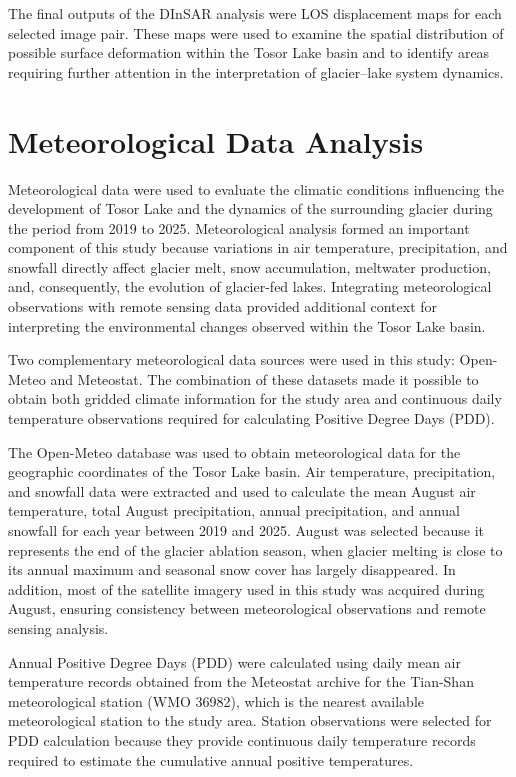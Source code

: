 \documentclass[12pt,a4paper]{report}
\begin{document}
The final outputs of the DInSAR analysis were LOS displacement maps for each selected image pair. These maps were used to examine the spatial distribution of possible surface deformation within the Tosor Lake basin and to identify areas requiring further attention in the interpretation of glacier–lake system dynamics.

\section{Meteorological Data Analysis}

Meteorological data were used to evaluate the climatic conditions influencing the development of Tosor Lake and the dynamics of the surrounding glacier during the period from 2019 to 2025. Meteorological analysis formed an important component of this study because variations in air temperature, precipitation, and snowfall directly affect glacier melt, snow accumulation, meltwater production, and, consequently, the evolution of glacier-fed lakes. Integrating meteorological observations with remote sensing data provided additional context for interpreting the environmental changes observed within the Tosor Lake basin.

Two complementary meteorological data sources were used in this study: Open-Meteo and Meteostat. The combination of these datasets made it possible to obtain both gridded climate information for the study area and continuous daily temperature observations required for calculating Positive Degree Days (PDD).

The Open-Meteo database was used to obtain meteorological data for the geographic coordinates of the Tosor Lake basin. Air temperature, precipitation, and snowfall data were extracted and used to calculate the mean August air temperature, total August precipitation, annual precipitation, and annual snowfall for each year between 2019 and 2025. August was selected because it represents the end of the glacier ablation season, when glacier melting is close to its annual maximum and seasonal snow cover has largely disappeared. In addition, most of the satellite imagery used in this study was acquired during August, ensuring consistency between meteorological observations and remote sensing analysis.

Annual Positive Degree Days (PDD) were calculated using daily mean air temperature records obtained from the Meteostat archive for the Tian-Shan meteorological station (WMO 36982), which is the nearest available meteorological station to the study area. Station observations were selected for PDD calculation because they provide continuous daily temperature records required to estimate the cumulative annual positive temperatures.
\end{document}
